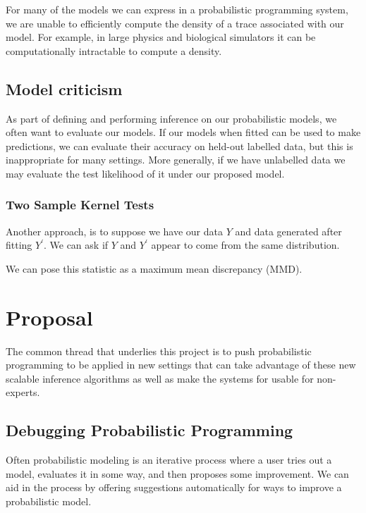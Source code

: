 \documentclass[12pt]{article}
\theoremstyle{definition}
\begin{document}
For many of the models we can express in a probabilistic programming
system, we are unable to efficiently compute the density of a trace
associated with our model. For example, in large physics and
biological simulators it can be computationally intractable
to compute a density.

\subsection{Model criticism}

As part of defining and performing inference on our probabilistic
models, we often want to evaluate our models. If our models when
fitted can be used to make predictions, we can evaluate their accuracy
on held-out labelled data, but this is inappropriate for many
settings. More generally, if we have unlabelled data we may evaluate
the test likelihood of it under our proposed model.

\subsubsection{Two Sample Kernel Tests}

Another approach, is to suppose we have our data $Y$ and data
generated after fitting $Y^\prime$. We can ask if $Y$ and $Y^\prime$
appear to come from the same distribution.

We can pose this statistic as a maximum mean discrepancy \citep{gretton2012kernel} (MMD).

\section{Proposal}

The common thread that underlies this project is to push probabilistic
programming to be applied in new settings that can take advantage of these
new scalable inference algorithms as well as make the systems for usable
for non-experts.

\subsection{Debugging Probabilistic Programming}

Often probabilistic modeling is an iterative process where a user
tries out a model, evaluates it in some way, and then proposes some
improvement. We can aid in the process by offering suggestions automatically
for ways to improve a probabilistic model.
\end{document}
